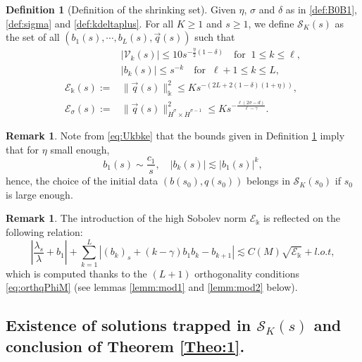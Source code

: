 \documentclass[11pt]{aims}
\theoremstyle{definition}
\newtheorem{definition}[theorem]{Definition}
\newtheorem{remark}[theorem]{Remark}
\numberwithin{equation}{section}
\begin{document}
\begin{definition}[Definition of the shrinking set]\label{def:Skset} Given $\eta$, $\sigma$ and $\delta$ as in \eqref{def:B0B1}, \eqref{def:sigma} and \eqref{def:kdeltaplus}. For all $K \geq 1$ and $s \geq 1$, we define ${\mathcal{S}}_K(s)$ as the set of all $(b_1(s), \cdots, b_L(s), \vec q(s))$ such that
\begin{align*}
&\left|{\mathcal{V}}_k(s) \right| \leq 10s^{-\frac{\eta}{2}(1 - \delta)} \quad \text{for}\;\; 1 \leq k \leq \ell,\\
&|b_k(s)| \leq s^{-k} \quad \text{for}\;\; \ell + 1 \leq k \leq L,\\
{\mathscr{E}}_{\Bbbk}(s):=&\|\vec q(s)\|^2_{\Bbbk}  \leq Ks^{-(2L + 2(1 - \delta)(1 + \eta))},\\
{\mathscr{E}}_{\sigma}(s):=&\|\vec q(s)\|^2_{\dot{H}^\sigma \times \dot H^{\sigma - 1}} \leq Ks^{-\frac{\ell(2\sigma - d)}{\ell - \gamma}}.
\end{align*}
\end{definition}

\begin{remark} Note from \eqref{eq:Ukbke} that the bounds given in Definition \ref{def:Skset} imply that for $\eta$ small enough, 
$$b_1(s) \sim \frac{c_1}{s}, \quad |b_k(s)| \lesssim |b_1(s)|^k,$$
hence, the choice of the initial data $(b(s_0), q(s_0))$ belongs in ${\mathcal{S}}_K(s_0)$ if $s_0$ is large enough.
\end{remark}

\begin{remark} The introduction of the high Sobolev norm ${\mathscr{E}}_{\Bbbk}$ is reflected on the following relation:
\begin{equation}\label{eq:modeq}
\left|\frac{\lambda_s}{\lambda} + b_1\right| + \sum_{k = 1}^L \left|(b_k)_s + (k - \gamma)b_1b_{k} - b_{k+1} \right| \lesssim C(M)\sqrt{{\mathscr{E}}_{\Bbbk}} + l.o.t, 
\end{equation}
which is computed thanks to the $(L+1)$ orthogonality conditions \eqref{eq:orthqPhiM} (see lemmas \ref{lemm:mod1} and \ref{lemm:mod2} below).
\end{remark}

\subsection{Existence of solutions trapped in ${\mathcal{S}}_K(s)$ and conclusion of Theorem \ref{Theo:1}.}
\end{document}
